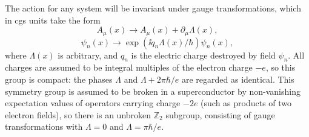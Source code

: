 The action for any system will be invariant under gauge transformations, which in cgs units take the form
\begin{equation}
A_\mu(x)\longrightarrow A_\mu(x)+\partial_\mu\Lambda(x),
\tag{21.6.1}\label{eq:21.6.1}
\end{equation}
\begin{equation}
\psi_n(x)\longrightarrow
\exp\!\left(\ii q_n\Lambda(x)/\hbar\right)\psi_n(x),
\tag{21.6.2}\label{eq:21.6.2}
\end{equation}
where $\Lambda(x)$ is arbitrary, and $q_n$ is the electric charge destroyed by field $\psi_n$. All charges are assumed to be integral multiples of the electron charge $-e$, so this group is compact: the phases $\Lambda$ and $\Lambda+2\pi\hbar/e$ are regarded as identical. This symmetry group is assumed to be broken in a superconductor by non-vanishing expectation values of operators carrying charge $-2e$ (such as products of two electron fields), so there is an unbroken $\mathbb Z_2$ subgroup, consisting of gauge transformations with $\Lambda=0$ and $\Lambda=\pi\hbar/e$.

